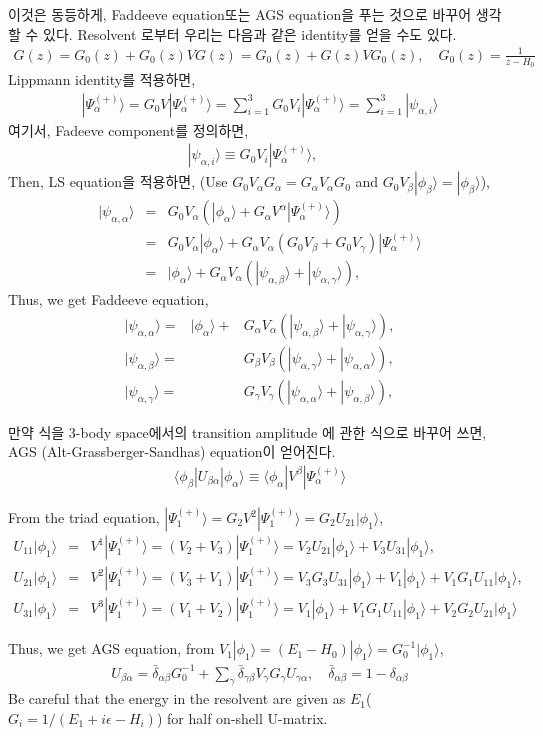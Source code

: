 \documentclass[11pt]{article}
\newcommand{\bea}{\begin{eqnarray}}
\newcommand{\eea}{\end{eqnarray}}
\newcommand{\no}{\nonumber \\}
\newcommand{\la}{\langle}
\newcommand{\ra}{\rangle}
\begin{document}
이것은 동등하게, Faddeeve equation또는 AGS equation을 푸는 것으로 바꾸어 생각할 수 있다. 
Resolvent 로부터 우리는 다음과 같은 identity를 얻을 수도 있다.
\bea 
G(z)=G_0(z)+G_0(z)VG(z)=G_0(z)+G(z)VG_0(z),\quad G_0(z)=\frac{1}{z-H_0}
\eea 
Lippmann identity를 적용하면,
\bea 
|\Psi^{(+)}_\alpha\ra =G_0 V|\Psi^{(+)}_\alpha\ra 
               = \sum_{i=1}^3 G_0 V_i|\Psi^{(+)}_\alpha\ra
               =\sum_{i=1}^3|\psi_{\alpha,i}\ra 
\eea  
여기서,  Fadeeve component를 정의하면,
\bea 
|\psi_{\alpha,i}\ra \equiv G_0 V_i|\Psi^{(+)}_\alpha\ra ,
\quad 
\eea 
Then, LS equation을 적용하면, (Use $G_0 V_\alpha G_\alpha=G_\alpha V_\alpha G_0$
and $G_0V_\beta|\phi_{\beta}\ra=|\phi_{\beta}\ra$),
\bea 
|\psi_{\alpha,\alpha}\ra&=&  G_0 V_\alpha (|\phi_{\alpha}\ra +G_\alpha V^\alpha 
|\Psi_{\alpha}^{(+)}\ra )\no 
 &=& G_0 V_\alpha |\phi_{\alpha}\ra +G_\alpha V_\alpha (G_0V_\beta+G_0 V_\gamma)|\Psi_{\alpha}^{(+)}\ra \no  
 &=& |\phi_{\alpha}\ra +G_\alpha V_\alpha (|\psi_{\alpha,\beta}\ra +|\psi_{\alpha,\gamma}\ra),
 \eea
 Thus, we get Faddeeve equation, 
\bea   
|\psi_{\alpha,\alpha}\ra=&|\phi_{\alpha}\ra + &G_\alpha V_\alpha (|\psi_{\alpha,\beta}\ra +|\psi_{\alpha,\gamma}\ra),\no 
|\psi_{\alpha,\beta}\ra =&  &G_\beta V_\beta( |\psi_{\alpha,\gamma}\ra +|\psi_{\alpha,\alpha}\ra),
 \no 
|\psi_{\alpha,\gamma}\ra =&  &G_\gamma V_\gamma( |\psi_{\alpha,\alpha}\ra +|\psi_{\alpha,\beta}\ra), 
\eea 

만약 식을 3-body space에서의 transition amplitude 에 관한 식으로 바꾸어 쓰면, AGS
(Alt-Grassberger-Sandhas) equation이 얻어진다. 
\bea 
\la \phi_{\beta}|U_{\beta\alpha}|\phi_{\alpha}\ra 
\equiv \la \phi_{\alpha} |V^\beta |\Psi_\alpha^{(+)}\ra 
\eea 

From the triad equation, $|\Psi_1^{(+)}\ra=G_2V^2|\Psi_1^{(+)}\ra=G_2 U_{21}|\phi_1\ra$,
\bea 
U_{11}|\phi_1\ra &=& V^1|\Psi_1^{(+)}\ra =(V_2+V_3)|\Psi_1^{(+)}\ra
                  = V_2 U_{21}|\phi_1\ra +V_3 U_{31}|\phi_1\ra,\no 
U_{21}|\phi_1\ra&=& V^2|\Psi_1^{(+)}\ra=(V_3+V_1)|\Psi_1^{(+)}\ra
                =V_3G_3 U_{31}|\phi_1\ra+V_1|\phi_1\ra+V_1G_1 U_{11}|\phi_1\ra,\no 
U_{31}|\phi_1\ra&=&V^3|\Psi_1^{(+)}\ra=(V_1+V_2)|\Psi_1^{(+)}\ra
                =V_1|\phi_1\ra+V_1G_1 U_{11}|\phi_1\ra
                +V_2G_2 U_{21}|\phi_1\ra
\eea 

Thus, we get AGS equation, from $V_1|\phi_1\ra=(E_1-H_0)|\phi_1\ra=G_0^{-1}|\phi_1\ra$,
\bea 
U_{\beta\alpha}=\bar{\delta}_{\alpha\beta} G_0^{-1} +
  \sum_{\gamma} \bar{\delta}_{\gamma\beta} V_\gamma G_\gamma U_{\gamma\alpha},
  \quad  \bar{\delta}_{\alpha\beta}=1-\delta_{\alpha\beta} 
\eea 
Be careful that the energy in the resolvent are given as $E_1$( $G_i=1/(E_1+i\epsilon-H_i)$)
for half on-shell U-matrix. 
\end{document}
